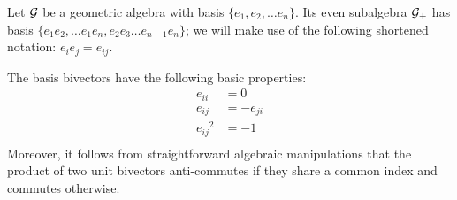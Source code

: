 \begin{lemma}
	Let $\mathcal{G}$ be a geometric algebra with basis $\{e_1, e_2, \ldots e_n\}$.
	Its even subalgebra $\mathcal{G}_+$ has basis $\{e_1e_2, \ldots e_1e_n, e_2e_3 \ldots e_{n-1}e_n\}$; we will make use of the following shortened notation: $e_ie_j = e_{ij}$.

	The basis bivectors have the following basic properties:
	\begin{align*}
		e_{ii} &= 0 \\
		e_{ij} &= -e_{ji} \\
		{e_{ij}}^2 &= -1 \\
	\end{align*}
	Moreover, it follows from straightforward algebraic manipulations that the product of two unit bivectors anti-commutes if they share a common index and commutes otherwise.

\end{lemma}
